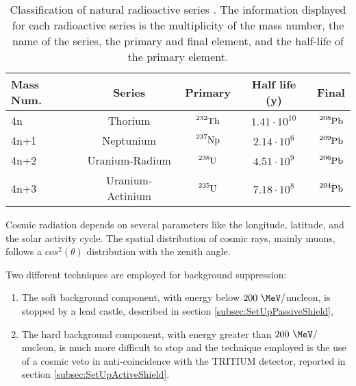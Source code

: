 \begin{table}[htbp]
\centering{}%
\begin{tabular}{lcccc}
\toprule 
Mass Num. & Series & Primary & Half life (y) & Final \tabularnewline
\midrule
\midrule 
4n & Thorium & $\ce{^{232}Th}$ & $1.41 \cdot{} 10^{10}$ & $\ce{^{208}Pb}$ \tabularnewline
4n+1 & Neptunium & $\ce{^{237}Np}$ & $2.14 \cdot{} 10^{6}$ & $\ce{^{209}Pb}$ \tabularnewline
4n+2 & Uranium-Radium & $\ce{^{238}U}$ & $4.51 \cdot{} 10^{9}$ & $\ce{^{206}Pb}$ \tabularnewline
4n+3 & Uranium-Actinium & $\ce{^{235}U}$ & $7.18 \cdot{} 10^{8}$ & $\ce{^{204}Pb}$ \tabularnewline
\bottomrule
\end{tabular}
\caption{Classification of natural radioactive series \cite{NaturalRadioactiveSeries1, NaturalRadioactiveSeries2}. The information displayed for each radioactive series is the multiplicity of the mass number, the name of the series, the primary and final element, and the half-life of the primary element.}
\label{tab:NaturalRadioactiveSeries}
\end{table}
Cosmic radiation depends on several parameters like the longitude, latitude, and the solar activity cycle. The spatial distribution of cosmic rays, mainly muons, follows a $cos^2(\theta)$ distribution with the zenith angle. 

Two different techniques are employed for background suppression:

\begin{enumerate}

\item{}  The soft background component, with energy below $200~\MeV/$nucleon, is stopped by a lead castle, described in section \ref{subsec:SetUpPassiveShield},

\item{} The hard background component, with energy greater than $200~\MeV/$nucleon, is much more difficult to stop and the technique employed is the use of a cosmic veto in anti-coincidence with the TRITIUM detector, reported in section \ref{subsec:SetUpActiveShield}. %

\end{enumerate}